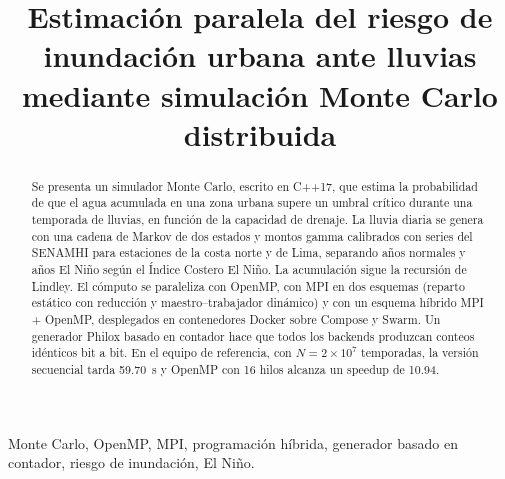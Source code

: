 \documentclass[conference,a4paper]{IEEEtran}
\begin{document}
\title{Estimación paralela del riesgo de inundación urbana ante lluvias mediante simulación Monte Carlo distribuida}

\author{
}

\maketitle

\begin{abstract}
Se presenta un simulador Monte Carlo, escrito en C++17, que estima la probabilidad de que el agua acumulada en una zona urbana supere un umbral crítico durante una temporada de lluvias, en función de la capacidad de drenaje. La lluvia diaria se genera con una cadena de Markov de dos estados y montos gamma calibrados con series del SENAMHI para estaciones de la costa norte y de Lima, separando años normales y años El Niño según el Índice Costero El Niño. La acumulación sigue la recursión de Lindley. El cómputo se paraleliza con OpenMP, con MPI en dos esquemas (reparto estático con reducción y maestro--trabajador dinámico) y con un esquema híbrido MPI + OpenMP, desplegados en contenedores Docker sobre Compose y Swarm. Un generador Philox basado en contador hace que todos los backends produzcan conteos idénticos bit a bit. En el equipo de referencia, con $N = 2\times10^{7}$ temporadas, la versión secuencial tarda \qty{59.70}{\second} y OpenMP con 16 hilos alcanza un speedup de \num{10.94}.
\end{abstract}

\begin{IEEEkeywords}
Monte Carlo, OpenMP, MPI, programación híbrida, generador basado en contador, riesgo de inundación, El Niño.
\end{IEEEkeywords}














\end{document}
